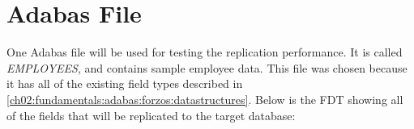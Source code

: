 


\section{Adabas File}
\label{ch05:methodology:adabasfile}
One Adabas file will be used for testing the replication performance. It is called \textit{EMPLOYEES}, and contains sample employee data. This file was chosen because it has all of the existing field types described in \ref{ch02:fundamentals:adabas:forzos:datastructures}. Below is the \ac{FDT} showing all of the fields that will be replicated to the target database:
